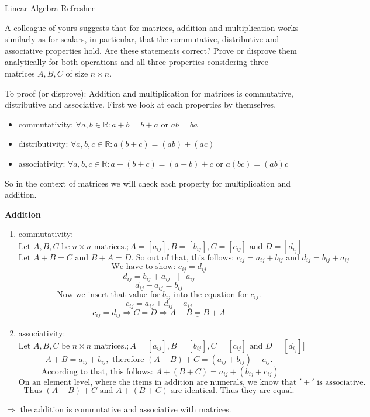 \documentclass[
	english,
        solution=true
	]{tudaexercise}
\newcommand{\R}{\mathbb{R}}
\begin{document}
\begin{task}[points=28]{Linear Algebra Refresher}

    \begin{subtask}[points=5,title=Matrix Properties]
A colleague of yours suggests that for matrices, addition and multiplication
works similarly as for scalars, in particular, that the commutative,
distributive and associative properties hold. Are these statements correct?
Prove or disprove them analytically for both operations and all three
properties considering three matrices $ A, B, C$ of size $n\times n$.

\begin{solution}

To proof (or disprove): Addition and multiplication for matrices is commutative, distributive and associative. First we look at each properties by themselves.\\

\begin{itemize}
    \item commutativity:  $\forall a, b \in \R: a+b=b+a$ or $ab=ba$
    \item distributivity: $\forall a, b, c \in \R: a(b+c) = (ab)+(ac)$
    \item associativity: $\forall a, b, c \in \R: a+(b+c)=(a+b)+c$ or $a(bc)=(ab)c$
\end{itemize}

So in the context of matrices we will check each property for multiplication and addition.

\textbf{Addition}

\begin{enumerate}
    \item commutativity: 
    \[ \text{Let } A, B, C \text{ be } n\times n \text{ matrices.}; A=[a_{ij}], B=[b_{ij}], C=[c_{ij}] \text{ and } D=[d_{i_j}] \]
    \[   \text{Let }A+B=C \text{ and } B+A=D. \text{ So out of that, this follows: } c_{ij} = a_{ij} + b_{ij} \text{ and } d_{ij} = b_{ij} + a_{ij}  \]
    \[\text{We have to show: } c_{ij} = d_{ij}\]
    \[d_{ij}=b_{ij}+a_{ij} \,\,\,\,\, | -a_{ij}\]
    \[d_{ij}-a_{ij}=b_{ij}\]
    \[\text{Now we insert that value for }b_{ij} \text{ into the equation for }c_{ij}.\]
    \[c_{ij}=a_{ij}+d_{ij}-a_{ij}\]
    \[c_{ij}=d_{ij} \Rightarrow C=D \Rightarrow \underline{\underline{A+B=B+A}}\]
    \item associativity:
    \[\text{Let } A, B, C \text{ be } n \times n \text{ matrices.};  A=[a_{ij}], B=[b_{ij}], C=[c_{ij}] \text{ and } D=[d_{i_j}]] \]
    \[A+B=a_{ij}+b_{ij}, \text{ therefore } (A+B)+C = (a_{ij} + b_{ij})+c_{ij}.\]
    \[\text{ According to that, this follows: }A+(B+C)=a_{ij}+(b_{ij}+c_{ij})\]
    \[\text{On an element level, where the items in addition are numerals, we know that }'+' \text{ is associative.}\]
    \[\text{Thus } (A+B)+C \text{ and } A+(B+C) \text{ are identical. Thus they are equal.}\]
\end{enumerate}
$\Rightarrow$ the addition is commutative and associative with matrices.


\end{solution}
\end{subtask}
\end{task}
\end{document}
